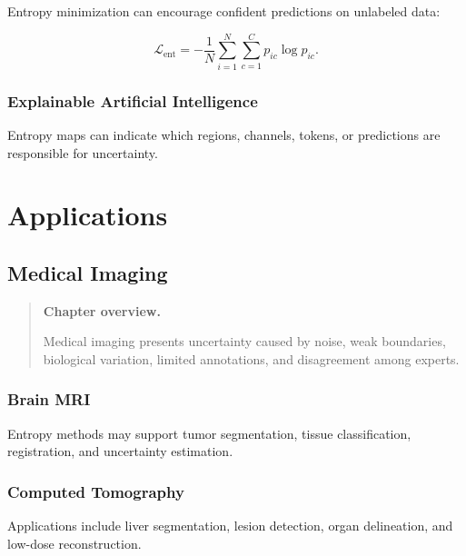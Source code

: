 \documentclass[11pt,oneside]{book}
\theoremstyle{remark}
\newenvironment{chapteroverview}
{
	\begin{quote}
		\small
		\textbf{Chapter overview.}
	}
	{
	\end{quote}
}
\begin{document}
	Entropy minimization can encourage confident predictions on unlabeled data:
	
	\[
	\mathcal{L}_{\mathrm{ent}}
	=
	-\frac{1}{N}
	\sum_{i=1}^{N}
	\sum_{c=1}^{C}
	p_{ic}\log p_{ic}.
	\]
	
	\section{Explainable Artificial Intelligence}
	
	Entropy maps can indicate which regions, channels, tokens, or predictions are
	responsible for uncertainty.
	
	
	\part{Applications}
	
	
	\chapter{Medical Imaging}
	\label{chap:medical-imaging}
	
	\begin{chapteroverview}
		Medical imaging presents uncertainty caused by noise, weak boundaries,
		biological variation, limited annotations, and disagreement among experts.
	\end{chapteroverview}
	
	\section{Brain MRI}
	
	Entropy methods may support tumor segmentation, tissue classification,
	registration, and uncertainty estimation.
	
	\section{Computed Tomography}
	
	Applications include liver segmentation, lesion detection, organ delineation,
	and low-dose reconstruction.
	
\end{document}
